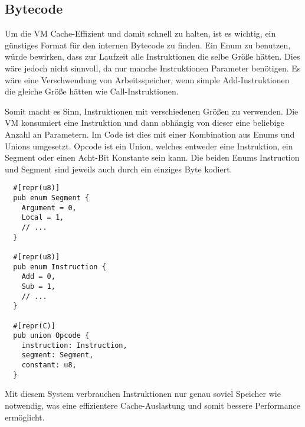 \subsection{Bytecode}

Um die VM Cache-Effizient und damit schnell zu halten, ist es wichtig, ein günstiges Format für den internen Bytecode zu finden.
Ein Enum zu benutzen, würde bewirken, dass zur Laufzeit alle Instruktionen die selbe Größe hätten. Dies wäre jedoch nicht sinnvoll, da nur manche Instruktionen Parameter benötigen.
Es wäre eine Verschwendung von Arbeitsspeicher, wenn simple Add-Instruktionen die gleiche Größe hätten wie Call-Instruktionen.

Somit macht es Sinn, Instruktionen mit verschiedenen Größen zu verwenden. Die VM konsumiert eine Instruktion und dann abhängig von dieser eine beliebige Anzahl an Parametern.
Im Code ist dies mit einer Kombination aus Enums und Unions umgesetzt. Opcode ist ein Union, welches entweder eine Instruktion, ein Segment oder einen Acht-Bit Konstante sein kann. Die beiden Enums Instruction und Segment sind jeweils auch durch ein einziges Byte kodiert.

\begin{lstlisting}
  #[repr(u8)]
  pub enum Segment {
    Argument = 0,
    Local = 1,
    // ...
  }

  #[repr(u8)]
  pub enum Instruction {
    Add = 0,
    Sub = 1,
    // ...
  }

  #[repr(C)]
  pub union Opcode {
    instruction: Instruction,
    segment: Segment,
    constant: u8,
  }
\end{lstlisting}

Mit diesem System verbrauchen Instruktionen nur genau soviel Speicher wie notwendig, was eine effizientere Cache-Auslastung und somit bessere Performance ermöglicht.

